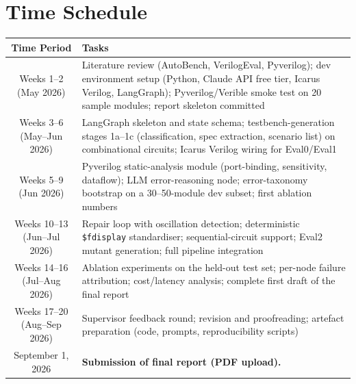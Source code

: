 \documentclass[11pt,a4paper, titlepage=false]{scrreprt}
\begin{document}

\section*{Time Schedule}

\vspace{0.7em}
\begin{tabular}{|c | p{}|}
\hline
\textbf{Time Period} & \textbf{Tasks} \\
\hline
Weeks 1--2 (May 2026) &
    Literature review (AutoBench, VerilogEval, Pyverilog); dev environment setup
    (Python, Claude API free tier, Icarus Verilog, LangGraph); Pyverilog/Verible
    smoke test on 20 sample modules; report skeleton committed \\
\hline
Weeks 3--6 (May--Jun 2026) &
    LangGraph skeleton and state schema; testbench-generation stages 1a--1c
    (classification, spec extraction, scenario list) on combinational circuits;
    Icarus Verilog wiring for Eval0/Eval1 \\
\hline
Weeks 5--9 (Jun 2026) &
    Pyverilog static-analysis module (port-binding, sensitivity, dataflow);
    LLM error-reasoning node; error-taxonomy bootstrap on a 30--50-module dev
    subset; first ablation numbers \\
\hline
Weeks 10--13 (Jun--Jul 2026) &
    Repair loop with oscillation detection; deterministic \texttt{\$fdisplay}
    standardiser; sequential-circuit support; Eval2 mutant generation; full
    pipeline integration \\
\hline
Weeks 14--16 (Jul--Aug 2026) &
    Ablation experiments on the held-out test set; per-node failure attribution;
    cost/latency analysis; complete first draft of the final report \\
\hline
Weeks 17--20 (Aug--Sep 2026) &
    Supervisor feedback round; revision and proofreading; artefact preparation
    (code, prompts, reproducibility scripts) \\
\hline
September 1, 2026 & \textbf{Submission of final report (PDF upload).} \\
\hline
\end{tabular}


\vspace{5mm}
\end{document}
